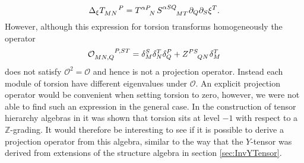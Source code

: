 \begin{equation}
\Delta_\xi \tensor{T}{_{MN}^P} = \tensor{T}{^{\alpha P}_N}\tensor{S}{^{\alpha SQ}_{MT}}\pd_Q\pd_S\xi^T.
\end{equation}
However, although this expression for torsion transforms homogeneously the operator 
\begin{equation}
    \tensor{\mathcal{O}}{_{MN,Q}^{P,ST}} = \delta^S_M\delta^T_N\delta_Q^P+\tensor{Z}{^{PS}_{QN}}\delta^T_M
\end{equation}
does not satisfy $\mathcal{O}^2=\mathcal{O}$ and hence is not a projection operator. Instead each module of torsion have different eigenvalues under $\mathcal{O}$. An explicit projection operator would be convenient when setting torsion to zero, however, we were not able to find such an expression in the general case. In the construction of tensor hierarchy algebras in \cite{Carbone:2018njd} it was shown that torsion sits at level $-1$ with respect to a $\mathbb{Z}$-grading. It would therefore be interesting to see if it is possible to derive a projection operator from this algebra, similar to the way that the $Y$-tensor was derived from extensions of the structure algebra in section \ref{sec:InvYTensor}. 


